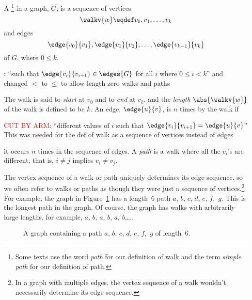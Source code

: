 \begin{definition}\label{def:undirected-path}
A \footnote{Some texts use the word \emph{path} for our
  definition of walk and the term \emph{simple path} for our
  definition of path.} in a graph, $G$, is a sequence of vertices
\begin{equation*}
\walkv{w} \eqdef v_0, v_1, \dots, v_k
\end{equation*}
and edges
\begin{equation*}
    \edge{v_0}{v_1}, \edge{v_1}{v_2}, \dots, \edge{v_{k - 1}}{v_k}
\end{equation*}
of $G$, where $0 \leq k$.
\begin{editingnotes}
  : ``such that $\edge{v_i}{v_{i+1}}
  \in \edges{G}$ for all $i$ where $0 \leq i < k$'' and changed $<$ to
  $\leq$ to allow length zero walks and paths
\end{editingnotes}
The walk is said to \emph{start} at $v_0$ and to
\emph{end} at $v_k$, and the 
\emph{length} $\abs{\walkv{w}}$ of the walk is
defined to be $k$.  An edge, $\edge{u}{v}$, is  $n$ times
by the walk if
\begin{editingnotes}
  \textcolor{red}{CUT BY ARM}:
  ``different values of $i$ such that $\edge{v_i}{v_{i+1}} =
  \edge{u}{v}$'' This was needed for the def of walk as a sequence of
  vertices instead of edges
\end{editingnotes} it occurs $n$ times in the sequence of
edges.  A \emph{path} is a walk where all the $v_i$'s are different,
that is, $i\neq j$ implies $v_i \neq v_j$.
\end{definition}

 The vertex sequence of a walk or path uniquely
determines its edge sequence, so we often refer to walks or paths as
though they were just a sequence of vertices.\footnote{In a graph with
  multiple edges, the vertex sequence of a walk wouldn't necessarily
  determine its edge sequence.}
For example, the graph in Figure~\ref{dg} has a length~6 path $a$,
$b$, $c$, $d$, $e$, $f$,~$g$.  This is the longest path in the graph.
Of course, the graph has walks with arbitrarily large lengths, for
example, $a$, $b$, $a$, $b$, $a$, $b$,\dots.

\begin{figure}[htbp]


\caption{A graph containing a path $a$, $b$, $c$, $d$, $e$, $f$,~$g$
  of length~6.}
\label{dg}
\end{figure}

